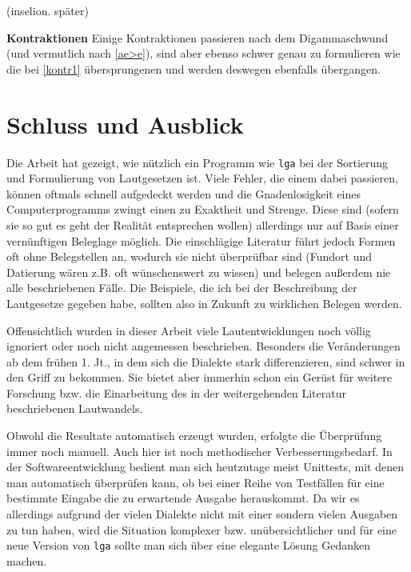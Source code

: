 \documentclass[12pt,a4paper,normalheadings]{scrartcl}
\newcounter{para}
\newcommand{\mypara}[1]{\vspace{1em}\par\noindent\refstepcounter{para}%
\textbf{\textsf{\thepara}}\enspace\textbf{#1}\quad}
\def\bel#1{\mbox{\textit{#1}}}
\def\tt#1{\texttt{#1}}
\begin{document}
\lex{\bel{ǣ}}{\bel{ē}} (inselion. später)

\mypara{Kontraktionen}
\label{kontr2}
Einige Kontraktionen passieren nach dem Digammaschwund
(und vermutlich nach \ref{ae>e}),
sind aber ebenso schwer genau zu formulieren
wie die bei \ref{kontr1} übersprungenen
und werden deswegen ebenfalls übergangen.

\section{Schluss und Ausblick}

Die Arbeit hat gezeigt,
wie nützlich ein Programm wie \tt{lga} bei der
Sortierung und Formulierung von Lautgesetzen ist.
Viele Fehler, die einem dabei passieren,
können oftmals schnell aufgedeckt werden und die Gnadenlosigkeit
eines Computerprogramms zwingt einen zu Exaktheit und Strenge.
Diese sind (sofern sie so gut es geht der Realität entsprechen wollen)
allerdings nur auf Basis einer vernünftigen Beleglage möglich.
Die einschlägige Literatur führt jedoch Formen oft ohne Belegstellen an,
wodurch sie nicht überprüfbar sind
(Fundort und Datierung wären z.B. oft wünschenswert zu wissen)
und belegen außerdem nie alle beschriebenen Fälle.
Die Beispiele, die ich bei der Beschreibung der Lautgesetze gegeben habe,
sollten also in Zukunft zu wirklichen Belegen werden.

Offensichtlich wurden in dieser Arbeit viele Lautentwicklungen
noch völlig ignoriert oder noch nicht angemessen beschrieben.
Besonders die Veränderungen ab dem frühen 1. Jt.,
in dem sich die Dialekte stark differenzieren,
sind schwer in den Griff zu bekommen.
Sie bietet aber immerhin schon ein Gerüst für weitere Forschung
bzw. die Einarbeitung des in der weitergehenden Literatur beschriebenen
Lautwandels.

Obwohl die Resultate automatisch erzeugt wurden,
erfolgte die Überprüfung immer noch manuell.
Auch hier ist noch methodischer Verbesserungsbedarf.
In der Softwareentwicklung bedient man sich heutzutage meist Unittests,
mit denen man automatisch überprüfen kann,
ob bei einer Reihe von Testfällen für eine bestimmte Eingabe die
zu erwartende Ausgabe herauskommt.
Da wir es allerdings aufgrund der vielen Dialekte
nicht mit einer sondern vielen Ausgaben zu tun haben,
wird die Situation komplexer bzw. unübersichtlicher und
für eine neue Version von \tt{lga} sollte man sich über eine elegante
Lösung Gedanken machen.
\end{document}
